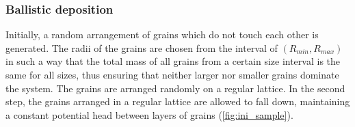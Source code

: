 \subsubsection{Ballistic deposition}
Initially, a random arrangement of grains which do not touch each other is 
generated. The radii of the grains are chosen from the 
interval of $(\mathit{R}_{\mathit{min}},\mathit{R}_{\mathit{max}})$ in such a 
way that the total mass of all grains from a certain size interval is the same 
for all sizes, thus ensuring that neither larger nor smaller grains dominate 
the system. 
The 
grains are arranged randomly on a regular lattice. In the second step, the 
grains arranged in a regular lattice are allowed to fall down, maintaining a 
constant potential head between layers of grains (\cref{fig:ini_sample}). 
%
%

